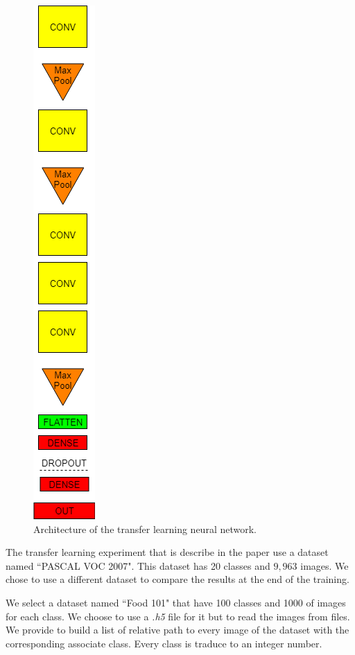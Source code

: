 \begin{figure}[!ht]
	\centering
	\includegraphics[scale=0.50]{images/FT_net.png}
	\caption{Architecture of the transfer learning neural network.}
	\label{fig:FT_net}
\end{figure}

The transfer learning experiment that is describe in the paper use a dataset named \textquotedblleft PASCAL VOC 2007". This dataset has 20 classes and $9,963$ images. We chose to use a different dataset to compare the results at the end of the training.

We select a dataset named \textquotedblleft Food 101" \cite{food_images} that have 100 classes and 1000 of images for each class. We choose to use a \textit{.h5} file for it but to read the images from files. We provide to build a list of relative path to every image of the dataset with the corresponding associate class. Every class is traduce to an integer number. 

